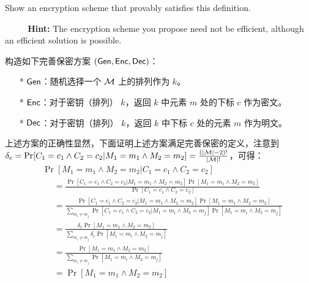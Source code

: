 \begin{questions}
\begin{parts}
            Show an encryption scheme that provably satisfies this definition.

            \par $\text{ }\text{ }\text{ }\text{ }$\textbf{Hint:} The encryption scheme you propose need not be efficient, although an efficient solution is possible.

            \begin{solution}
                \newline
                构造如下完善保密方案 $(\mathsf{Gen},\mathsf{Enc},\mathsf{Dec})$：
                \begin{enumerate}
                    \item[*] $\mathsf{Gen}$：随机选择一个 $\mathcal{M}$ 上的排列作为 $k$。
                    \item[*] $\mathsf{Enc}$：对于密钥（排列） $k$，返回 $k$ 中元素 $m$ 处的下标 $c$ 作为密文。
                    \item[*] $\mathsf{Dec}$：对于密钥（排列） $k$，返回 $k$ 中下标 $c$ 处的元素 $m$ 作为明文。
                \end{enumerate}
                上述方案的正确性显然，下面证明上述方案满足完善保密的定义，注意到 $\delta_c=\Pr[C_1=c_1\wedge{C_2}=c_2|M_1=m_1\wedge{M_2}=m_2]=\frac{(|\mathcal{M}|-2)!}{|\mathcal{M}|!}$，可得：
                \begin{equation}
                    \begin{aligned}
                        & \Pr[M_1=m_1\wedge{M_2}=m_2|C_1=c_1\wedge{C_2}=c_2]\\
                        & \text{ }\text{ }=\frac{\Pr[C_1=c_1\wedge{C_2}=c_2|M_1=m_1\wedge{M_2}=m_2]\Pr[M_1=m_1\wedge{M_2}=m_2]}{\Pr[C_1=c_1\wedge{C_2}=c_2]}\\
                        & \text{ }\text{ }=\frac{\Pr[C_1=c_1\wedge{C_2}=c_2|M_1=m_1\wedge{M_2}=m_2]\Pr[M_1=m_1\wedge{M_2}=m_2]}{\sum_{m_i\neq{m_j}}\Pr[C_1=c_1\wedge{C_2}=c_2|M_1=m_i\wedge{M_2}=m_j]\Pr[M_1=m_i\wedge{M_2}=m_j]}\\
                        & \text{ }\text{ }=\frac{\delta_c\Pr[M_1=m_1\wedge{M_2}=m_2]}{\sum_{m_i\neq{m_j}}\delta_c\Pr[M_1=m_i\wedge{M_2}=m_j]}\\
                        & \text{ }\text{ }=\frac{\Pr[M_1=m_1\wedge{M_2}=m_2]}{\sum_{m_i\neq{m_j}}\Pr[M_1=m_i\wedge{M_2}=m_j]}\\
                        & \text{ }\text{ }=\Pr[M_1=m_1\wedge{M_2}=m_2]
                    \end{aligned}
                \end{equation}
            \end{solution}

        \end{parts}

\end{questions}



